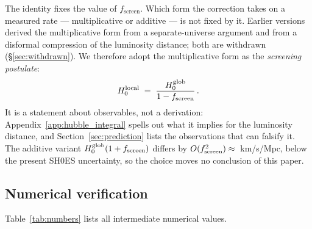 \documentclass[12pt,a4paper]{article}
\newcommand{\fsc}{f_{\mathrm{screen}}}
\begin{document}
The identity fixes the value of $\fsc$. Which form the correction takes on a
measured rate --- multiplicative or additive --- is not fixed by it. Earlier
versions derived the multiplicative form from a separate-universe argument and
from a disformal compression of the luminosity distance; both are withdrawn
(§\ref{sec:withdrawn}). We therefore adopt the multiplicative form as the
\emph{screening postulate}:
\begin{equation}
  H_0^{\rm local} \;=\; \frac{H_0^{\rm glob}}{1-\fsc}\,.
  \label{eq:screen_postulate}
\end{equation}
It is a statement about observables, not a derivation:
Appendix~\ref{app:hubble_integral} spells out what it implies for the
luminosity distance, and Section~\ref{sec:prediction} lists the observations
that can falsify it. The additive variant $H_0^{\rm glob}(1+\fsc)$ differs by
$O(\fsc^2)\approx\val{p9_add_dif}$~km/s/Mpc, below the present SH0ES uncertainty, so the
choice moves no conclusion of this paper.

\subsection{Numerical verification}
\label{sec:numerics}

Table~\ref{tab:numbers} lists all intermediate numerical values.
\end{document}
